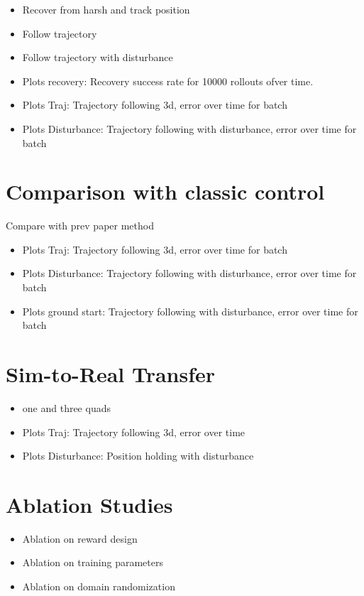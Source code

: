 \begin{itemize}
    \item Recover from harsh and track position
    \item Follow trajectory
    \item Follow trajectory with disturbance
    \item Plots recovery: Recovery success rate for 10000 rollouts ofver time.
    \item Plots Traj: Trajectory following 3d, error over time for batch
    \item Plots Disturbance: Trajectory following with disturbance, error over time for batch
\end{itemize}
\section{Comparison with classic control}
Compare with prev paper method \autocite{Wahba2024}
\begin{itemize}
    \item Plots Traj: Trajectory following 3d, error over time for batch
    \item Plots Disturbance: Trajectory following with disturbance, error over time for batch
    \item Plots ground start: Trajectory following with disturbance, error over time for batch
\end{itemize} 
\section{Sim-to-Real Transfer}
\begin{itemize}
    \item one and three quads
    \item Plots Traj: Trajectory following 3d,  error over time 
    \item Plots Disturbance: Position holding with disturbance
\end{itemize}


\section{Ablation Studies}
\begin{itemize}
    \item Ablation on reward design
    \item Ablation on training parameters
    \item Ablation on domain randomization
    
\end{itemize}